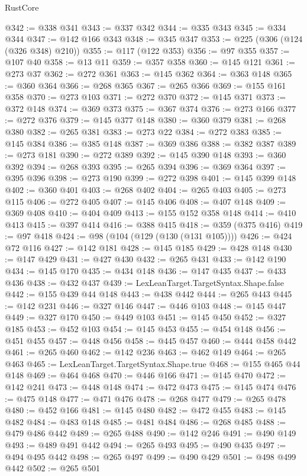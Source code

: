 \begin{lexlean}{RustCore}
\begin{coremodule}
@342 := @338 @341
@343 := @337 @342
@344 := @335 @343
@345 := @334 @344
@347 := @142 @166 @343
@348 := @345 @347
@353 := @225 (@306 (@124 (@326 @348) @210))
@355 := @117 (@122 @353)
@356 := @97 @355
@357 := @107 @40
@358 := @13 @11
@359 := @357 @358
@360 := @145 @121
@361 := @273 @37
@362 := @272 @361
@363 := @145 @362
@364 := @363 @148
@365 := @360 @364
@366 := @268 @365
@367 := @265 @366
@369 := @155 @161 @358
@370 := @273 @103
@371 := @272 @370
@372 := @145 @371
@373 := @372 @148
@374 := @369 @373
@375 := @367 @374
@376 := @273 @166
@377 := @272 @376
@379 := @145 @377 @148
@380 := @360 @379
@381 := @268 @380
@382 := @265 @381
@383 := @273 @22
@384 := @272 @383
@385 := @145 @384
@386 := @385 @148
@387 := @369 @386
@388 := @382 @387
@389 := @273 @181
@390 := @272 @389
@392 := @145 @390 @148
@393 := @360 @392
@394 := @268 @393
@395 := @265 @394
@396 := @369 @364
@397 := @395 @396
@398 := @273 @190
@399 := @272 @398
@401 := @145 @399 @148
@402 := @360 @401
@403 := @268 @402
@404 := @265 @403
@405 := @273 @115
@406 := @272 @405
@407 := @145 @406
@408 := @407 @148
@409 := @369 @408
@410 := @404 @409
@413 := @155 @152 @358 @148
@414 := @410 @413
@415 := @397 @414
@416 := @388 @415
@418 := @359 (@375 @416)
@419 := @97 @418
@424 := @98 (@104 (@129 (@130 (@131 @105))))
@426 := @424 @72 @116
@427 := @142 @181
@428 := @145 @185
@429 := @428 @148
@430 := @147 @429
@431 := @427 @430
@432 := @265 @431
@433 := @142 @190
@434 := @145 @170
@435 := @434 @148
@436 := @147 @435
@437 := @433 @436
@438 := @432 @437
@439 := LexLeanTarget.TargetSyntax.Shape.false
@442 := @155 @439 @44 @148
@443 := @438 @442
@444 := @265 @443
@445 := @142 @231
@446 := @327 @146
@447 := @446 @103
@448 := @145 @447
@449 := @327 @170
@450 := @449 @103
@451 := @145 @450
@452 := @327 @185
@453 := @452 @103
@454 := @145 @453
@455 := @454 @148
@456 := @451 @455
@457 := @448 @456
@458 := @445 @457
@460 := @444 @458 @442
@461 := @265 @460
@462 := @142 @236
@463 := @462 @149
@464 := @265 @463
@465 := LexLeanTarget.TargetSyntax.Shape.true
@468 := @155 @465 @44 @148
@469 := @464 @468
@470 := @446 @166
@471 := @145 @470
@472 := @142 @241
@473 := @448 @148
@474 := @472 @473
@475 := @145 @474
@476 := @475 @148
@477 := @471 @476
@478 := @268 @477
@479 := @265 @478
@480 := @452 @166
@481 := @145 @480
@482 := @472 @455
@483 := @145 @482
@484 := @483 @148
@485 := @481 @484
@486 := @268 @485
@488 := @479 @486 @442
@489 := @265 @488
@490 := @142 @246
@491 := @490 @149
@493 := @489 @491 @442
@494 := @265 @493
@495 := @490 @435
@497 := @494 @495 @442
@498 := @265 @497
@499 := @490 @429
@501 := @498 @499 @442
@502 := @265 @501

\end{coremodule}
\end{lexlean}
